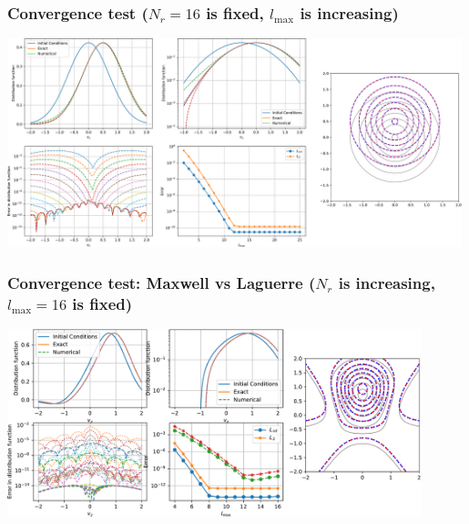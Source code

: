\documentclass[mathserif, aspectratio=169]{beamer}
\newcommand{\vect}[1]{\boldsymbol{#1}}
\newcommand{\of}[1]{\mleft( #1 \mright)}
\begin{document}
\begin{frame}
\frametitle{\small Convergence test ($N_r = 16$ is fixed, $l_{\max}$ is increasing)}
\begin{center}
\includegraphics[width=0.99\textwidth]{figures/advection_operator_changing_lmax}
\end{center}
\end{frame}

\begin{frame}
\frametitle{\small Convergence test: Maxwell vs Laguerre ($N_r$ is increasing, $l_{\max} = 16$ is fixed) }
\begin{center}
\includegraphics[width=0.9\textwidth]{figures/advection_operator_laguerre}
\end{center}
\end{frame}
\end{document}
